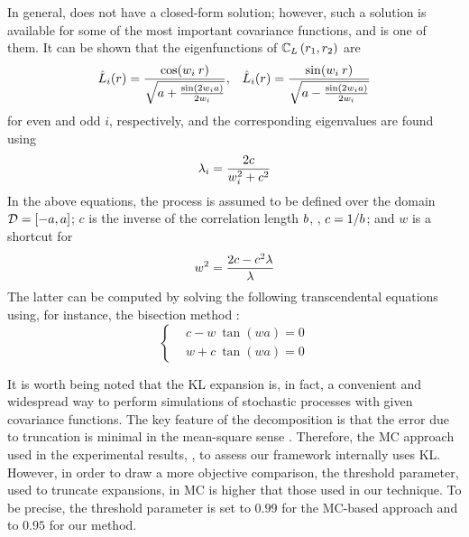 In general,  does not have a closed-form solution; however, such a solution is available for some of the most important covariance functions, and  is one of them. It can be shown \cite{ghanem1991} that the eigenfunctions of $\mathbb{C}_{L}\left(r_1, r_2\right)$ are
\begin{align*}
  & \hat{L}_i(r) = \frac{\cos(w_i \: r)}{\sqrt{a + \frac{\sin(2 w_i a)}{2 w_i}}}, & \hat{L}_i(r) = \frac{\sin(w_i \: r)}{\sqrt{a - \frac{\sin(2 w_i a)}{2 w_i}}}
\end{align*}
for even and odd $i$, respectively, and the corresponding eigenvalues are found using
\[
  \lambda_i = \frac{2 c}{w_i^2 + c^2}
\]
In the above equations, the process is assumed to be defined over the domain $\mathcal{D} = [-a, a]$; $c$ is the inverse of the correlation length $b$, \ie, $c = 1 / b$; and $w$ is a shortcut for
\[
  w^2 = \frac{2 c - c^2 \lambda}{\lambda}
\]
The latter can be computed by solving the following transcendental equations using, for instance, the bisection method \cite{press2007}:
\begin{equation*}
  \begin{cases}
    & c - w \: \tan (w a) = 0 \\
    & w + c \: \tan (w a) = 0
  \end{cases}
\end{equation*}

It is worth being noted that the KL expansion is, in fact, a convenient and widespread way to perform simulations of stochastic processes with given covariance functions. The key feature of the decomposition is that the error due to truncation is minimal in the mean-square sense \cite{ghanem1991}. Therefore, the MC approach used in the experimental results, , to assess our framework internally uses KL. However, in order to draw a more objective comparison, the threshold parameter, used to truncate expansions, in MC is higher that those used in our technique. To be precise, the threshold parameter is set to $0.99$ for the MC-based approach and to $0.95$ for our method.
